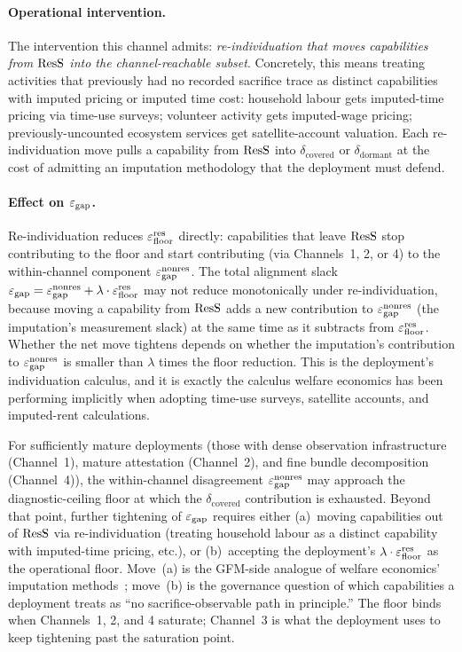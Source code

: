 \paragraph{Operational intervention.}
The intervention this channel admits: \emph{re-individuation that
moves capabilities from $\mathrm{ResS}$ into the channel-reachable
subset}.  Concretely, this means treating activities that
previously had no recorded sacrifice trace as distinct capabilities
with imputed pricing or imputed time cost: household labour gets
imputed-time pricing via time-use surveys; volunteer activity gets
imputed-wage pricing; previously-uncounted ecosystem services get
satellite-account valuation.  Each re-individuation move pulls a
capability from $\mathrm{ResS}$ into $\delta_{\mathrm{covered}}$ or
$\delta_{\mathrm{dormant}}$ at the cost of admitting an imputation
methodology that the deployment must defend.

\paragraph{Effect on $\varepsilon_{\mathrm{gap}}$.}
Re-individuation reduces $\varepsilon_{\mathrm{floor}}^{\mathrm{res}}$ directly: capabilities that
leave $\mathrm{ResS}$ stop contributing to the floor and start contributing
(via Channels~1, 2, or 4) to the within-channel component
$\varepsilon_{\mathrm{gap}}^{\mathrm{nonres}}$.  The total alignment slack $\varepsilon_{\mathrm{gap}} = \varepsilon_{\mathrm{gap}}^{\mathrm{nonres}} +
\lambda \cdot \varepsilon_{\mathrm{floor}}^{\mathrm{res}}$ may not reduce monotonically under
re-individuation, because moving a capability from $\mathrm{ResS}$ adds
a new contribution to $\varepsilon_{\mathrm{gap}}^{\mathrm{nonres}}$ (the imputation's measurement
slack) at the same time as it subtracts from $\varepsilon_{\mathrm{floor}}^{\mathrm{res}}$.
Whether the net move tightens depends on whether the imputation's
contribution to $\varepsilon_{\mathrm{gap}}^{\mathrm{nonres}}$ is smaller than $\lambda$ times the
floor reduction.  This is the deployment's individuation calculus,
and it is exactly the calculus welfare economics has been
performing implicitly when adopting time-use surveys, satellite
accounts, and imputed-rent calculations.

\begin{remark}
\label{rem:floor_binds}
For sufficiently mature deployments (those with dense observation
infrastructure (Channel~1), mature attestation (Channel~2), and
fine bundle decomposition (Channel~4)), the within-channel
disagreement $\varepsilon_{\mathrm{gap}}^{\mathrm{nonres}}$ may approach the diagnostic-ceiling
floor at which the $\delta_{\mathrm{covered}}$ contribution is
exhausted.  Beyond that point, further tightening of $\varepsilon_{\mathrm{gap}}$
requires either (a)~moving capabilities out of $\mathrm{ResS}$ via
re-individuation (treating household labour as a distinct
capability with imputed-time pricing, etc.), or (b)~accepting
the deployment's $\lambda \cdot \varepsilon_{\mathrm{floor}}^{\mathrm{res}}$ as the operational
floor.  Move~(a) is the GFM-side analogue of welfare economics'
imputation methods~\citep{stiglitz2009report,aguiar2007measuring};
move~(b) is the governance question of which capabilities a
deployment treats as ``no sacrifice-observable path in
principle.''  The floor binds when Channels~1, 2, and 4 saturate;
Channel~3 is what the deployment uses to keep tightening past the
saturation point.
\end{remark}

